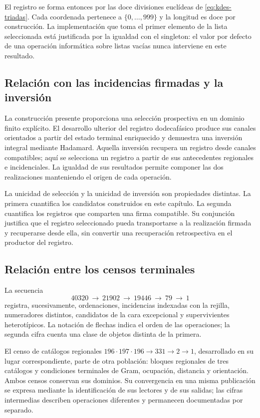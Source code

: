 El registro se forma entonces por las doce divisiones euclídeas de
\eqref{eq:kdes-triadas}. Cada coordenada pertenece a
$\{0,\ldots,999\}$ y la longitud es doce por construcción. La
implementación que toma el primer elemento de la lista seleccionada
está justificada por la igualdad con el singleton: el valor por defecto
de una operación informática sobre listas vacías nunca interviene en
este resultado.

\subsection{Relación con las incidencias firmadas y la inversión}

La construcción presente proporciona una selección prospectiva en un
dominio finito explícito. El desarrollo ulterior del registro
dodecafásico produce sus canales orientados a partir del estado
terminal enriquecido y demuestra una inversión integral mediante
Hadamard. Aquella inversión recupera un registro desde canales
compatibles; aquí se selecciona un registro a partir de sus
antecedentes regionales e incidenciales. La igualdad de sus resultados
permite componer las dos realizaciones manteniendo el origen de cada
operación.

La unicidad de selección y la unicidad de inversión son propiedades
distintas. La primera cuantifica los candidatos construidos en este
capítulo. La segunda cuantifica los registros que comparten una firma
compatible. Su conjunción justifica que el registro seleccionado pueda
transportarse a la realización firmada y recuperarse desde ella, sin
convertir una recuperación retrospectiva en el productor del registro.

\subsection{Relación entre los censos terminales}

La secuencia
\[
 40320\ \longrightarrow\ 21902\ \longrightarrow\ 19446
 \ \longrightarrow\ 79\ \longrightarrow\ 1
\]
registra, sucesivamente, ordenaciones, incidencias indexadas con la
rejilla, numeradores distintos, candidatos de la cara excepcional y
supervivientes heterotípicos. La notación de flechas indica el orden de
las operaciones; la segunda cifra cuenta una clase de objetos
distinta de la primera.

El censo de catálogos regionales
$196\cdot197\cdot196\longrightarrow331\longrightarrow2
\longrightarrow1$, desarrollado en su lugar correspondiente, parte de
otra población: bloques regionales de tres catálogos y condiciones
terminales de Gram, ocupación, distancia y orientación. Ambos censos
conservan sus dominios. Su convergencia en una misma publicación se
expresa mediante la identificación de sus lectores y de sus salidas;
las cifras intermedias describen operaciones diferentes y permanecen
documentadas por separado.

